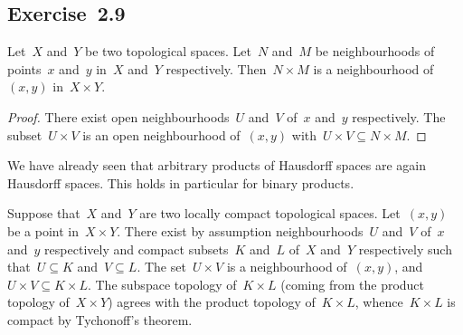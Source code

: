 \subsection{Exercise~2.9}

\begin{lemma}
	Let~$X$ and~$Y$ be two topological spaces.
	Let~$N$ and~$M$ be neighbourhoods of points~$x$ and~$y$ in~$X$ and~$Y$ respectively.
	Then~$N × M$ is a neighbourhood of~$(x, y)$ in~$X × Y$.
\end{lemma}

\begin{proof}
	There exist open neighbourhoods~$U$ and~$V$ of~$x$ and~$y$ respectively.
	The subset~$U × V$ is an open neighbourhood of~$(x, y)$ with~$U × V ⊆ N × M$.
\end{proof}

We have already seen that arbitrary products of Hausdorff spaces are again Hausdorff spaces.
This holds in particular for binary products.

Suppose that~$X$ and~$Y$ are two locally compact topological spaces.
Let~$(x, y)$ be a point in~$X × Y$.
There exist by assumption neighbourhoods~$U$ and~$V$ of~$x$ and~$y$ respectively and compact subsets~$K$ and~$L$ of~$X$ and~$Y$ respectively such that~$U ⊆ K$ and~$V ⊆ L$.
The set~$U × V$ is a neighbourhood of~$(x, y)$, and~$U × V ⊆ K × L$.
The subspace topology of~$K × L$ (coming from the product topology of~$X × Y$) agrees with the product topology of~$K × L$, whence~$K × L$ is compact by Tychonoff’s theorem.
